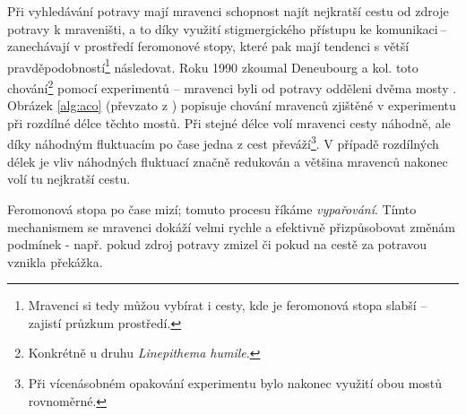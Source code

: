\documentclass[a4paper,12pt]{article}
\begin{document}

Při vyhledávání potravy mají mravenci schopnost najít nejkratší cestu od zdroje potravy k mraveništi,
a to díky využití stigmergického přístupu ke komunikaci\,--\,zanechávají v prostředí
feromonové stopy, které pak mají tendenci s větší pravděpodobností\footnote{Mravenci si tedy můžou vybírat i
cesty, kde je feromonová stopa slabší -- zajistí průzkum prostředí.} následovat. Roku 1990 zkoumal
Deneubourg a kol. toto
chování\footnote{Konkrétně u druhu {\it Linepithema humile}.} pomocí experimentů -- mravenci byli od potravy
odděleni dvěma mosty \cite{Dorigo06antcolony}. Obrázek \ref{alg:aco} (převzato z \cite{Blum08SwarmOpt})
popisuje chování mravenců zjištěné v experimentu při rozdílné
délce těchto mostů. Při stejné délce volí mravenci cesty náhodně, ale díky náhodným fluktuacím po čase
jedna z cest převáží\footnote{Při vícenásobném opakování experimentu bylo nakonec využití obou mostů rovnoměrné.}.
V případě rozdílných délek je vliv náhodných fluktuací značně redukován a většina mravenců nakonec volí
tu nejkratší cestu.

Feromonová stopa po čase mizí; tomuto procesu říkáme {\it vypařování}. Tímto mechanismem se
mravenci dokáží velmi rychle a efektivně přizpůsobovat změnám podmínek - např. pokud zdroj
potravy zmizel či pokud na cestě za potravou vznikla překážka.
\end{document}
